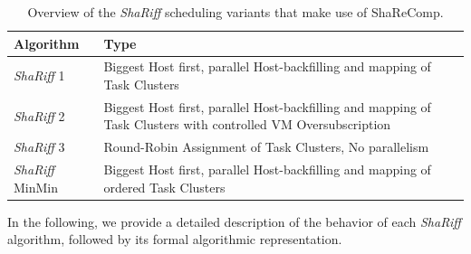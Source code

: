 \begin{table}[H]
    \centering
    \footnotesize
    \begin{tabularx}{\textwidth}{l p{10cm}}
        \toprule
        \textbf{Algorithm} & \textbf{Type}                                                                                                  \\
        \midrule
        \textit{ShaRiff} 1          & Biggest Host first, parallel Host-backfilling and mapping of Task Clusters                                     \\
        \textit{ShaRiff} 2          & Biggest Host first, parallel Host-backfilling and mapping of Task Clusters with controlled VM Oversubscription \\
        \textit{ShaRiff} 3          & Round-Robin Assignment of Task Clusters, No parallelism                                                        \\
        \textit{ShaRiff} MinMin     & Biggest Host first, parallel Host-backfilling and mapping of ordered Task Clusters                             \\
        \bottomrule
    \end{tabularx}
    \small
    \caption{Overview of the \textit{ShaRiff} scheduling variants that make use of ShaReComp.}
    \label{tab:shariff_overview}
\end{table}


In the following, we provide a detailed description of the behavior of each \textit{ShaRiff} algorithm, followed by its formal algorithmic representation.

